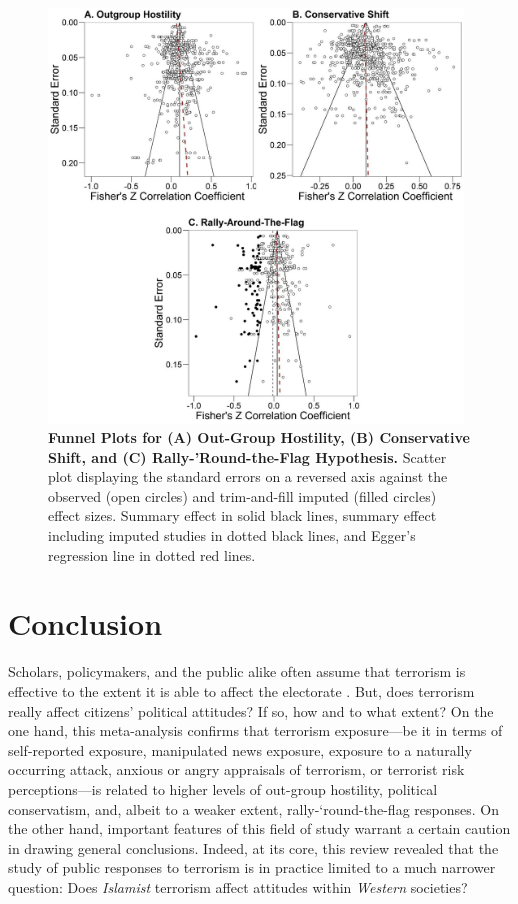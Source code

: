 \begin{figure}[H]
\centering
\includegraphics[width=0.98\textwidth]{Chapter_5/art4-figure4.jpg}
\caption[Funnel Plots for (A) Out-Group Hostility, (B) Conservative Shift, and (C) Rally-'Round-the-Flag Hypothesis]{\textbf{Funnel Plots for (A) Out-Group Hostility, (B) Conservative Shift, and (C) Rally-'Round-the-Flag Hypothesis.}  Scatter plot displaying the standard errors on a reversed axis against the observed (open circles) and trim-and-fill imputed (filled circles) effect sizes. Summary effect in solid black lines, summary effect including imputed studies in dotted black lines, and Egger’s regression line in dotted red lines.}
\label{fig:art4-fig4}
\end{figure}
\newpage


\section{Conclusion}
Scholars, policymakers, and the public alike often assume that terrorism is effective to the extent it is able to affect the electorate \citep{Crenshaw1986}. But, does terrorism really affect citizens' political attitudes? If so, how and to what extent? On the one hand, this meta-analysis confirms that terrorism exposure—be it in terms of self-reported exposure, manipulated news exposure, exposure to a naturally occurring attack, anxious or angry appraisals of terrorism, or terrorist risk perceptions—is related to higher levels of out-group hostility, political conservatism, and, albeit to a weaker extent, rally-‘round-the-flag responses. On the other hand, important features of this field of study warrant a certain caution in drawing general conclusions. Indeed, at its core, this review revealed that the study of public responses to terrorism is in practice limited to a much narrower question: Does \textit{Islamist} terrorism affect attitudes within \textit{Western} societies?

